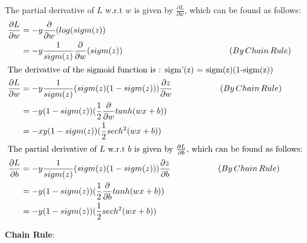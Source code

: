 \documentclass[solution,addpoints,12pt]{exam}
\begin{document}
\begin{questions}
\begin{parts}
\begin{solution}
                The partial derivative of $L$ w.r.t $w$ is given by $\frac{\partial L}{\partial w}$,  which can be found as follows:
                \begin{align*}
                    \frac{\partial L}{\partial w} &= -y \frac{\partial}{\partial w}(log(sigm(z))\\
                    &=  -y \frac{1}{sigm(z)}\frac{\partial}{\partial w}(sigm(z))\hspace*{45mm}(By\,Chain\,Rule)\\ \intertext{The derivative of the sigmoid function is : sigm'(z) = sigm(z)(1-sigm(z))}
                    \frac{\partial L}{\partial w} &= -y\frac{1}{sigm(z)}(sigm(z)(1-sigm(z))) \frac{\partial z}{\partial w}\hspace*{20mm}(By\,Chain\,Rule)\\
                    &= -y (1-sigm(z))(\frac{1}{2}\frac{\partial }{\partial w}tanh(wx+b))\\
                    &= -xy (1-sigm(z))(\frac{1}{2} sech^{2}(wx+b))\\
                \intertext{The partial derivative of $L$ w.r.t $b$ is given by $\frac{\partial L}{\partial b}$,  which can be found as follows:}
                \frac{\partial L}{\partial b} &= -y\frac{1}{sigm(z)}(sigm(z)(1-sigm(z))) \frac{\partial z}{\partial b}\hspace*{20mm}(By\,Chain\,Rule)\\
                &= -y (1-sigm(z))(\frac{1}{2}\frac{\partial }{\partial b}tanh(wx+b))\\
                &= -y (1-sigm(z))(\frac{1}{2} sech^{2}(wx+b))
                \end{align*}
              \end{solution}

         \end{parts}  
         

\question 
\textbf{Chain Rule}:
    \begin{parts}

\end{parts}
\end{questions}
\end{document}
